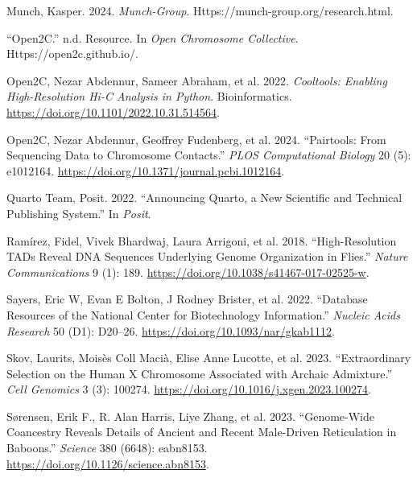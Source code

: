 \documentclass[
  11pt,
  a4paper,
]{scrbook}
\newlength{\cslhangindent}
\newenvironment{CSLReferences}[2] %
 {\begin{list}{}{%
  \setlength{\itemindent}{0pt}
  \setlength{\leftmargin}{0pt}
  \setlength{\parsep}{0pt}
  \ifodd #1
   \setlength{\leftmargin}{\cslhangindent}
   \setlength{\itemindent}{-1\cslhangindent}
  \fi
  \setlength{\itemsep}{#2\baselineskip}}}
 {\end{list}}
\begin{document}
\begin{CSLReferences}{1}{1}
Munch, Kasper. 2024. \emph{Munch-Group}.
Https://munch-group.org/research.html.

{``{Open2C}.''} n.d. Resource. In \emph{Open {Chromosome Collective}}.
Https://open2c.github.io/.

Open2C, Nezar Abdennur, Sameer Abraham, et al. 2022. \emph{Cooltools:
Enabling High-Resolution {Hi-C} Analysis in {Python}}. Bioinformatics.
\url{https://doi.org/10.1101/2022.10.31.514564}.

Open2C, Nezar Abdennur, Geoffrey Fudenberg, et al. 2024. {``Pairtools:
{From} Sequencing Data to Chromosome Contacts.''} \emph{PLOS
Computational Biology} 20 (5): e1012164.
\url{https://doi.org/10.1371/journal.pcbi.1012164}.

Quarto Team, Posit. 2022. {``Announcing {Quarto}, a New Scientific and
Technical Publishing System.''} In \emph{Posit}.

Ramírez, Fidel, Vivek Bhardwaj, Laura Arrigoni, et al. 2018.
{``High-Resolution {TADs} Reveal {DNA} Sequences Underlying Genome
Organization in Flies.''} \emph{Nature Communications} 9 (1): 189.
\url{https://doi.org/10.1038/s41467-017-02525-w}.

Sayers, Eric W, Evan E Bolton, J Rodney Brister, et al. 2022.
{``Database Resources of the National Center for Biotechnology
Information.''} \emph{Nucleic Acids Research} 50 (D1): D20--26.
\url{https://doi.org/10.1093/nar/gkab1112}.

Skov, Laurits, Moisès Coll Macià, Elise Anne Lucotte, et al. 2023.
{``Extraordinary Selection on the Human {X} Chromosome Associated with
Archaic Admixture.''} \emph{Cell Genomics} 3 (3): 100274.
\url{https://doi.org/10.1016/j.xgen.2023.100274}.

Sørensen, Erik F., R. Alan Harris, Liye Zhang, et al. 2023.
{``Genome-Wide Coancestry Reveals Details of Ancient and Recent
Male-Driven Reticulation in Baboons.''} \emph{Science} 380 (6648):
eabn8153. \url{https://doi.org/10.1126/science.abn8153}.


\end{CSLReferences}
\end{document}

